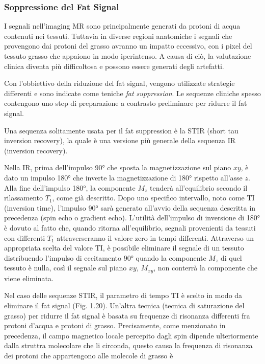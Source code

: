 \documentclass[leqno,10pt,twocolumn,a4paper]{article}
\begin{document}
	\subsubsection{Soppressione del Fat Signal}
	I segnali nell'imaging MR sono principalmente generati da protoni di acqua contenuti nei tessuti. Tuttavia in diverse regioni anatomiche i segnali che provengono dai protoni del grasso avranno
	un impatto eccessivo, con i pixel del tessuto grasso che appaiono in modo iperintenso. A causa di ciò, la valutazione clinica diventa più difficoltosa e possono essere generati degli artefatti.
	\par Con l'obbiettivo della riduzione del fat signal, vengono utilizzate strategie differenti e sono indicate come teniche \textit{fat suppression}. Le sequenze cliniche spesso contengono uno
	step di preparazione a contrasto preliminare per ridurre il fat signal. \par Una sequenza solitamente usata per il fat suppression è la STIR (short tau inversion recovery), la quale è una versione
	più generale della sequenza IR (inversion recovery). \par Nella IR, prima dell'impulso 90° che sposta la magnetizzazione sul piano $xy$, è dato un impulso 180° che inverte la magnetizzazione
	di 180° rispetto all'asse $z$. Alla fine dell'impulso 180°, la componente $M_z$ tenderà all'equilibrio secondo il rilassamento $T_1$, come già descritto. Dopo uno specifico intervallo, noto come
	TI (inversion time), l'impulso 90° sarà generato all'avvio della sequenza descritta in precedenza (spin echo o gradient echo). L'utilità dell'impulso di inversione di 180° è dovuto al fatto che, 
	quando ritorna all'equilibrio, segnali provenienti da tessuti con differenti $T_1$ attraverseranno il valore zero in tempi differenti. Attraverso un appropriata scelta del valore TI, è possibile
	eliminare il segnale di un tessuto distribuendo l'impulso di eccitamento 90° quando la componente $M_z$ di quel tessuto è nulla, così il segnale sul piano $xy$, $M_{xy}$, non conterrà
	la componente che viene eliminata. \par Nel caso delle sequenze STIR, il parametro di tempo TI è scelto in modo da eliminare il fat signal (Fig. 1.20). Un'altra tecnica (tecnica di saturazione
	del grasso) per ridurre il fat signal è basata su frequenze di risonanza differenti fra protoni d'acqua e protoni di grasso. Precisamente, come menzionato in precedenza, il campo magnetico
	locale percepito dagli spin dipende ulteriormente dalla struttra molecolare che li circonda, questo causa la frequenza di risonanza dei protoni che appartengono alle molecole di grasso è 
\end{document}
